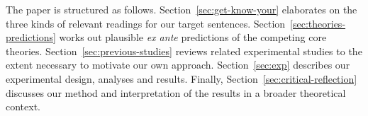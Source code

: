 \documentclass[fleqn,reqno,10pt]{article}
\renewcommand{\es}{\acro{es}}
\renewcommand{\mymark}[1]{\textbf{#1}}
\begin{document}


The paper is structured as follows. Section~\ref{sec:get-know-your}
elaborates on the three kinds of relevant readings for our target
sentences. Section~\ref{sec:theories-predictions} works out plausible
\emph{ex ante} predictions of the competing core
theories. Section~\ref{sec:previous-studies} reviews related
experimental studies to the extent necessary to motivate our own
approach. Section~\ref{sec:exp} describes our experimental design,
analyses and results. Finally, Section~\ref{sec:critical-reflection}
discusses our method and interpretation of the results in a broader
theoretical context.
\end{document}
